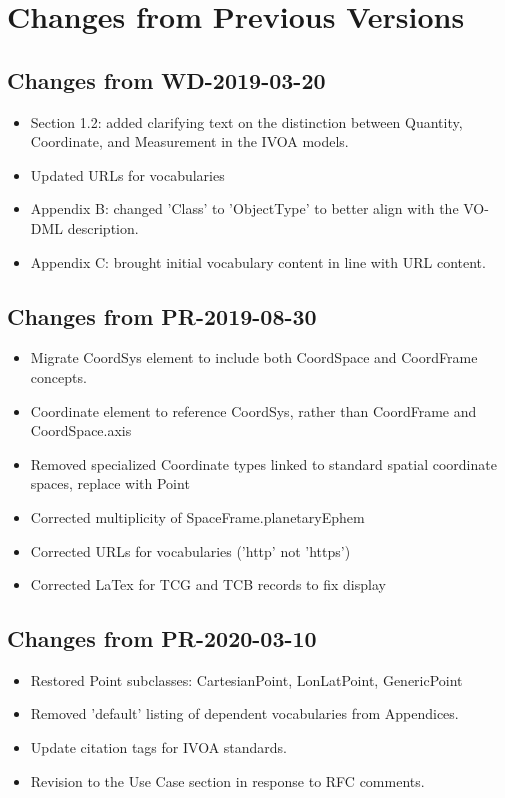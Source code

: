 \pagebreak
\section{Changes from Previous Versions}


\subsection{Changes from WD-2019-03-20}
\begin{itemize} 
  \item Section 1.2: added clarifying text on the distinction between Quantity, Coordinate, and Measurement in the IVOA models.
  \item Updated URLs for vocabularies
  \item Appendix B: changed 'Class' to 'ObjectType' to better align with the VO-DML description.
  \item Appendix C: brought initial vocabulary content in line with URL content.
\end{itemize}
\subsection{Changes from PR-2019-08-30}
\begin{itemize} 
  \item Migrate CoordSys element to include both CoordSpace and CoordFrame concepts.
  \item Coordinate element to reference CoordSys, rather than CoordFrame and CoordSpace.axis
  \item Removed specialized Coordinate types linked to standard spatial coordinate spaces, replace with Point
  \item Corrected multiplicity of SpaceFrame.planetaryEphem
  \item Corrected URLs for vocabularies ('http' not 'https')
  \item Corrected LaTex for TCG and TCB records to fix display 
\end{itemize}
\subsection{Changes from PR-2020-03-10}
\begin{itemize} 
  \item Restored Point subclasses: CartesianPoint, LonLatPoint, GenericPoint
  \item Removed 'default' listing of dependent vocabularies from Appendices.
  \item Update citation tags for IVOA standards.
  \item Revision to the Use Case section in response to RFC comments.
\end{itemize}
